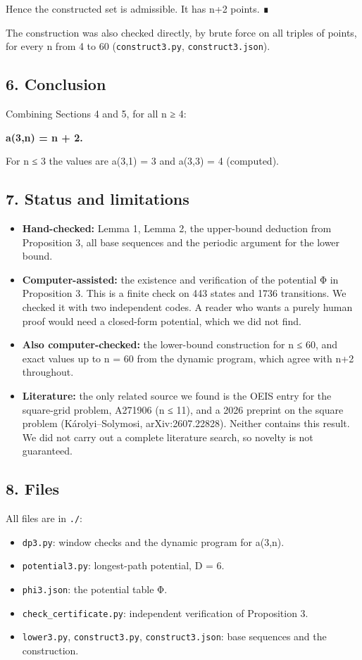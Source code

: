 \documentclass[
  11pt,
]{article}
\providecommand{\tightlist}{%
  \setlength{\itemsep}{0pt}\setlength{\parskip}{0pt}}
\begin{document}
Hence the constructed set is admissible. It has n+2 points. ∎

The construction was also checked directly, by brute force on all
triples of points, for every n from 4 to 60 (\texttt{construct3.py},
\texttt{construct3.json}).

\subsection{6. Conclusion}\label{conclusion}

Combining Sections 4 and 5, for all n ≥ 4:

\textbf{a(3,n) = n + 2.}

For n ≤ 3 the values are a(3,1) = 3 and a(3,3) = 4 (computed).

\subsection{7. Status and limitations}\label{status-and-limitations}

\begin{itemize}
\tightlist
\item
  \textbf{Hand-checked:} Lemma 1, Lemma 2, the upper-bound deduction
  from Proposition 3, all base sequences and the periodic argument for
  the lower bound.
\item
  \textbf{Computer-assisted:} the existence and verification of the
  potential Φ in Proposition 3. This is a finite check on 443 states and
  1736 transitions. We checked it with two independent codes. A reader
  who wants a purely human proof would need a closed-form potential,
  which we did not find.
\item
  \textbf{Also computer-checked:} the lower-bound construction for n ≤
  60, and exact values up to n = 60 from the dynamic program, which
  agree with n+2 throughout.
\item
  \textbf{Literature:} the only related source we found is the OEIS
  entry for the square-grid problem, A271906 (n ≤ 11), and a 2026
  preprint on the square problem (Károlyi--Solymosi, arXiv:2607.22828).
  Neither contains this result. We did not carry out a complete
  literature search, so novelty is not guaranteed.
\end{itemize}

\subsection{8. Files}\label{files}

All files are in \texttt{./}:

\begin{itemize}
\tightlist
\item
  \texttt{dp3.py}: window checks and the dynamic program for a(3,n).
\item
  \texttt{potential3.py}: longest-path potential, D = 6.
\item
  \texttt{phi3.json}: the potential table Φ.
\item
  \texttt{check\_certificate.py}: independent verification of
  Proposition 3.
\item
  \texttt{lower3.py}, \texttt{construct3.py}, \texttt{construct3.json}:
  base sequences and the construction.
\end{itemize}
\end{document}
